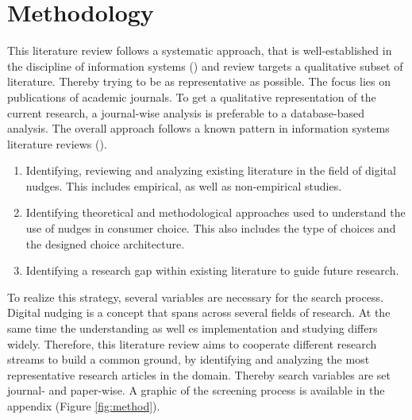 \section{Methodology}

This literature review follows a systematic approach, that is well-established in the discipline of information systems (\cite{webster_analyzing_2002}) and review targets a qualitative subset of literature. Thereby trying to be as representative as possible. The focus lies on publications of academic journals. To get a qualitative representation of the current research, a journal-wise analysis is preferable to a database-based analysis. The overall approach follows a known pattern in information systems literature reviews (\cite{alavi_review_1992}).
\begin{enumerate}
\item Identifying, reviewing and analyzing existing literature in the field of digital nudges. This includes empirical, as well as non-empirical studies.
\item Identifying theoretical and methodological approaches used to understand the use of nudges in consumer choice. This also includes the type of choices and the designed choice architecture.
\item Identifying a research gap within existing literature to guide future research.
\end{enumerate}

To realize this strategy, several variables are necessary for the search process. Digital nudging is a concept that spans across several fields of research. At the same time the understanding as well es implementation and studying differs widely. Therefore, this literature review aims to cooperate  different research streams to build a common ground, by identifying and analyzing the most representative research articles in the domain. Thereby search variables are set journal- and paper-wise. A graphic of the screening process is available in the appendix (Figure \ref{fig:method}).

